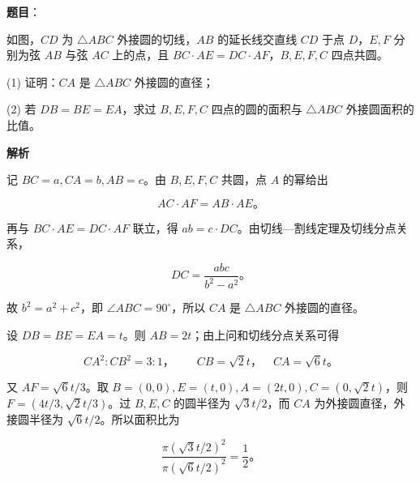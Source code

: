 \begin{answer}

\textbf{题目}：

如图，$CD$ 为 $\triangle ABC$ 外接圆的切线，$AB$ 的延长线交直线 $CD$ 于点 $D$，$E,F$ 分别为弦 $AB$ 与弦 $AC$ 上的点，且 $BC\cdot AE=DC\cdot AF$，$B,E,F,C$ 四点共圆。
\nopagebreak[4]
\begin{center}\end{center}
\nopagebreak[4]
(1) 证明：$CA$ 是 $\triangle ABC$ 外接圆的直径；

(2) 若 $DB=BE=EA$，求过 $B,E,F,C$ 四点的圆的面积与 $\triangle ABC$ 外接圆面积的比值。

\textbf{解析}


记 $BC=a,CA=b,AB=c$。由 $B,E,F,C$ 共圆，点 $A$ 的幂给出

\nopagebreak[4]
\[AC\cdot AF=AB\cdot AE\text{。}\]

再与 $BC\cdot AE=DC\cdot AF$ 联立，得 $ab=c\cdot DC$。由切线—割线定理及切线分点关系，

\nopagebreak[4]
\[DC=\frac{abc}{b^2-a^2}\text{。}\]

故 $b^2=a^2+c^2$，即 $\angle ABC=90^\circ$，所以 $CA$ 是 $\triangle ABC$ 外接圆的直径。


设 $DB=BE=EA=t$。则 $AB=2t$；由上问和切线分点关系可得

\nopagebreak[4]
\[CA^2:CB^2=3:1\text{，}\qquad CB=\sqrt2t\text{，}\quad CA=\sqrt6t\text{。}\]

又 $AF=\sqrt6t/3$。取 $B=(0,0),E=(t,0),A=(2t,0),C=(0,\sqrt2t)$，则 $F=(4t/3,\sqrt2t/3)$。过 $B,E,C$ 的圆半径为 $\sqrt3t/2$，而 $CA$ 为外接圆直径，外接圆半径为 $\sqrt6t/2$。所以面积比为

\nopagebreak[4]
\[\frac{\pi(\sqrt3t/2)^2}{\pi(\sqrt6t/2)^2}=\frac12\text{。}\]



\end{answer}
